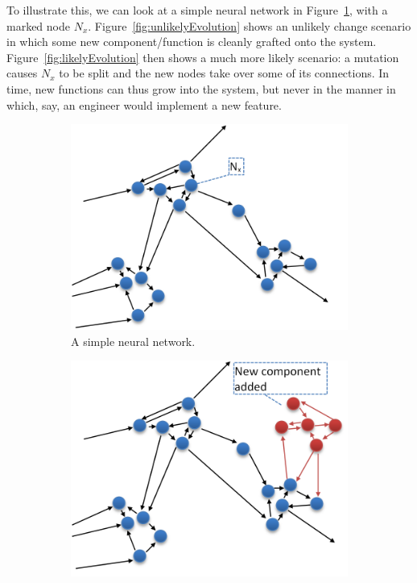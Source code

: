 To illustrate this, we can look at a simple neural network in Figure~\ref{fig:neuralNetwork}, with a marked node $N_x$. Figure~\ref{fig:unlikelyEvolution} shows an unlikely change scenario in which some new component/function is cleanly grafted onto the system. Figure~\ref{fig:likelyEvolution} then shows a much more likely scenario: a mutation causes $N_x$ to be split and the new nodes take over some of its connections. In time, new functions can thus grow into the system, but never in the manner in which, say, an engineer would implement a new feature.

\begin{figure}
	\centering
	\begin{subfigure}[t]{0.45\textwidth}
		\includegraphics[width=\textwidth]{figs/neuralNetwork.png}
		\caption{A simple neural network.}
		\label{fig:neuralNetwork}
	\end{subfigure}
	\begin{subfigure}[t]{0.45\textwidth}
		\includegraphics[width=\textwidth]{figs/unlikelyEvolution.png}

\end{subfigure}
\end{figure}
